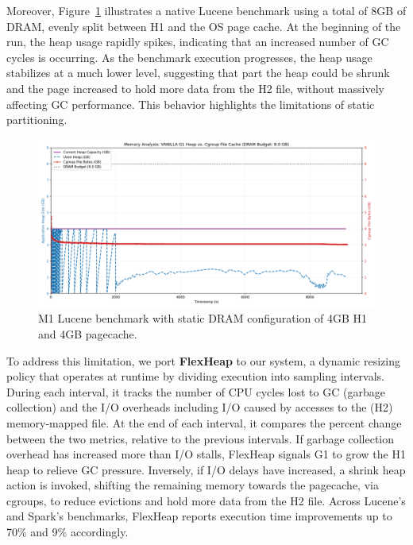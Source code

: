 Moreover, Figure~\ref{fig:vanilla-dram-underutilization} illustrates a native
Lucene benchmark using a total of 8GB of DRAM, evenly split between H1 and the
OS page cache. At the beginning of the run, the heap usage rapidly spikes,
indicating that an increased number of GC cycles is occurring. As the benchmark execution progresses, the heap usage
stabilizes at a much lower level, suggesting that part the heap could be shrunk 
and the page increased to hold more data from the H2 file, without massively affecting GC
performance. This behavior highlights the limitations of static partitioning.
\begin{figure}[htbp]
	\centering
	\includegraphics[width=1\linewidth]{fig/combined_memory_timeline_vanilla_g1.png}
	\caption{
		M1 Lucene benchmark with static DRAM configuration of 4GB H1 and 4GB pagecache.
	}
	\label{fig:vanilla-dram-underutilization}
\end{figure}

To address this limitation, we port \textbf{FlexHeap} to our system,
a dynamic resizing policy that operates at runtime by
dividing execution into sampling intervals. During each interval, it tracks the
number of CPU cycles lost to GC (garbage collection) and the I/O overheads including I/O caused by
accesses to the (H2) memory-mapped file. At the end of each interval, it compares the percent 
change between the two metrics, relative to the previous intervals. If garbage
collection overhead has increased more than I/O stalls, FlexHeap signals G1 to grow
the H1 heap to relieve GC pressure. Inversely, if I/O delays have increased,
a shrink heap action is invoked, shifting the remaining memory towards the pagecache, via cgroups, to reduce evictions and hold 
more data from the H2 file. Across Lucene's and Spark's benchmarks, FlexHeap reports execution time improvements
up to 70\% and 9\% accordingly.



